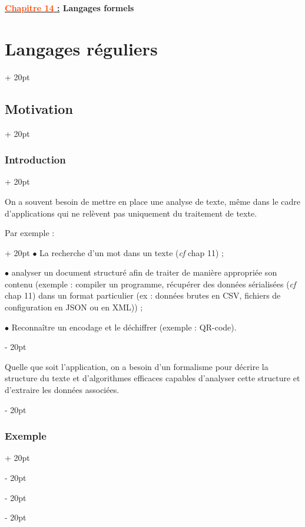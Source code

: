 \documentclass[a4paper, 12pt, twoside]{article}
\newcommand{\Emph}{\textcolor{ff4500}}
\newcommand{\ind}[1][20pt]{\advance\leftskip + #1}
\newcommand{\deind}[1][20pt]{\advance\leftskip - #1}
\newenvironment{indt}[2][20pt]{#2 \par \ind[#1]}{\par \deind} %
\newcommand{\thetitle}[2]{\begin{center}\textbf{{\LARGE \underline{\Emph{#1} :}} {\Large #2}}\end{center}}
\begin{document}
    
    \thetitle{Chapitre 14}{Langages formels}
    
    \tableofcontents
    \listofalgorithms
    \newpage
    
    \begin{indt}{\section{Langages réguliers}}
        \begin{indt}{\subsection{Motivation}}
            \begin{indt}{\subsubsection{Introduction}}
                \label{1.1.1}

                On a souvent besoin de mettre en place une analyse de texte, même dans le cadre d'applications qui ne relèvent pas uniquement du traitement de texte.

                \begin{indt}{Par exemple :}
                    $\bullet$ La recherche d'un mot dans un texte (\textit{cf} chap 11) ;

                    $\bullet$ analyser un document structuré afin de traiter de manière appropriée son contenu (exemple : compiler un programme, récupérer des données sérialisées (\textit{cf} chap 11) dans un format particulier (ex : données brutes en CSV, fichiers de configuration en JSON ou en XML)) ;

                    $\bullet$ Reconnaître un encodage et le déchiffrer (exemple : QR-code).
                \end{indt}

                \vspace{12pt}
                
                Quelle que soit l'application, on a besoin d'un formalisme pour décrire la structure du texte et d'algorithmes efficaces capables d'analyser cette structure et d'extraire les données associées.
            \end{indt}

            \vspace{12pt}
            
            \begin{indt}{\subsubsection{Exemple}}
                \label{1.1.2}


\end{indt}
\end{indt}
\end{indt}
\end{document}
